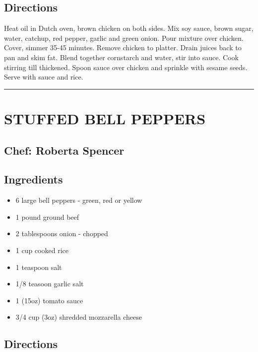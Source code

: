 \documentclass[
]{book}
\providecommand{\tightlist}{%
  \setlength{\itemsep}{0pt}\setlength{\parskip}{0pt}}
\begin{document}
\hypertarget{directions-65}{%
\subsection*{Directions}\label{directions-65}}


Heat oil in Dutch oven, brown chicken on both sides. Mix soy sauce, brown sugar, water, catchup, red pepper, garlic and green onion. Pour mixture over chicken. Cover, simmer 35-45 minutes. Remove chicken to platter. Drain juices back to pan and skim fat. Blend together cornstarch and water, stir into sauce. Cook stirring till thickened. Spoon sauce over chicken and sprinkle with sesame seeds. Serve with sauce and rice.

\begin{center}\rule{0.5\linewidth}{0.5pt}\end{center}

\hypertarget{stuffed-bell-peppers}{%
\section*{STUFFED BELL PEPPERS}\label{stuffed-bell-peppers}}


\hypertarget{chef-roberta-spencer-23}{%
\subsection*{Chef: Roberta Spencer}\label{chef-roberta-spencer-23}}


\hypertarget{ingredients-66}{%
\subsection*{Ingredients}\label{ingredients-66}}


\begin{itemize}
\tightlist
\item
  6 large bell peppers - green, red or yellow
\item
  1 pound ground beef
\item
  2 tablespoons onion - chopped
\item
  1 cup cooked rice
\item
  1 teaspoon salt
\item
  1/8 teasoon garlic salt
\item
  1 (15oz) tomato sauce
\item
  3/4 cup (3oz) shredded mozzarella cheese
\end{itemize}

\hypertarget{directions-66}{%
\subsection*{Directions}\label{directions-66}}
\end{document}
